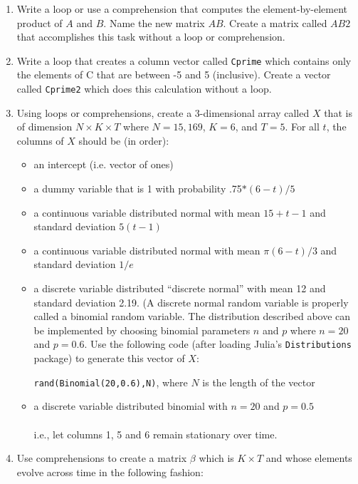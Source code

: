\documentclass[12pt,english]{article}
\begin{document}
\begin{enumerate}
\begin{enumerate}
\item Write a loop or use a comprehension that computes the element-by-element product of $A$ and $B$. Name the new matrix $AB$. Create a matrix called $AB2$ that accomplishes this task without a loop or comprehension.
\item Write a loop that creates a column vector called \texttt{Cprime} which contains only the elements of C that are between -5 and 5 (inclusive). Create a vector called \texttt{Cprime2} which does this calculation without a loop.
\item Using loops or comprehensions, create a 3-dimensional array called $X$ that is of dimension $N\times K\times T$ where $N=15,169$, $K=6$, and $T=5$. For all $t$, the columns of $X$ should be (in order):

\begin{itemize}
\item an intercept (i.e. vector of ones)
\item a dummy variable that is 1 with probability .75$*\left(6-t\right)/5$
\item a continuous variable distributed normal with mean $15+t-1$ and standard deviation $5\left(t-1\right)$
\item a continuous variable distributed normal with mean $\pi\left(6-t\right)/3$ and standard deviation $1/e$
\item a discrete variable distributed ``discrete normal'' with mean 12 and standard deviation 2.19. (A discrete normal random variable is properly called a binomial random variable. The distribution described above can be implemented by choosing binomial parameters $n$ and $p$ where $n=20$ and $p=0.6$. Use the following code (after loading Julia's \texttt{Distributions} package) to generate this vector of $X$:

\texttt{rand(Binomial(20,0.6),N)}, where $N$ is the length of the vector

\item a discrete variable distributed binomial with $n=20$ and $p=0.5$\\
\\
i.e., let columns 1, 5 and 6 remain stationary over time. 
\end{itemize}
\item Use comprehensions to create a matrix $\beta$ which is $K\times T$ and whose elements evolve across time in the following fashion:


\end{enumerate}
\end{enumerate}
\end{document}
